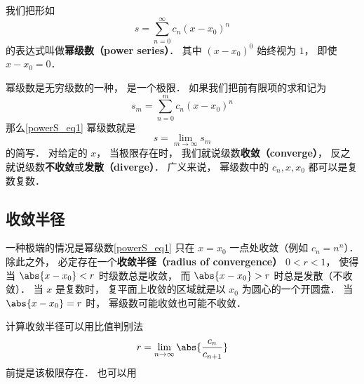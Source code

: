 
\begin{issues}
\issueDraft
\end{issues}


我们把形如
\begin{equation}\label{powerS_eq1}
s = \sum_{n=0}^\infty c_n (x-x_0)^n
\end{equation}
的表达式叫做\textbf{幂级数（power series）}． 其中 $(x-x_0)^0$ 始终视为 $1$， 即使 $x-x_0 = 0$．

幂级数是无穷级数的一种， 是一个极限． 如果我们把前有限项的求和记为
\begin{equation}
s_m = \sum_{n=0}^m c_n (x-x_0)^n
\end{equation}
那么\autoref{powerS_eq1} 幂级数就是
\begin{equation}
s = \lim_{m\to\infty} s_m
\end{equation}
的简写． 对给定的 $x$， 当极限存在时， 我们就说级数\textbf{收敛（converge）}， 反之就说级数\textbf{不收敛}或\textbf{发散（diverge）}． 广义来说， 幂级数中的 $c_n, x, x_0$ 都可以是复数复数．

\subsection{收敛半径}
一种极端的情况是幂级数\autoref{powerS_eq1} 只在 $x = x_0$ 一点处收敛（例如 $c_n = n^n$）． 除此之外， 必定存在一个\textbf{收敛半径（radius of convergence）} $0 < r < 1$， 使得当 $\abs{x-x_0} < r$ 时级数总是收敛， 而 $\abs{x-x_0} > r$ 时总是发散（不收敛）． 当 $x$ 是复数时， 复平面上收敛的区域就是以 $x_0$ 为圆心的一个开圆盘． 当 $\abs{x - x_0} = r$ 时， 幂级数可能收敛也可能不收敛．

计算收敛半径可以用比值判别法
\begin{equation}
r = \lim_{n \to \infty} \abs{\frac{c_n}{c_{n+1}}}
\end{equation}
前提是该极限存在． 也可以用
